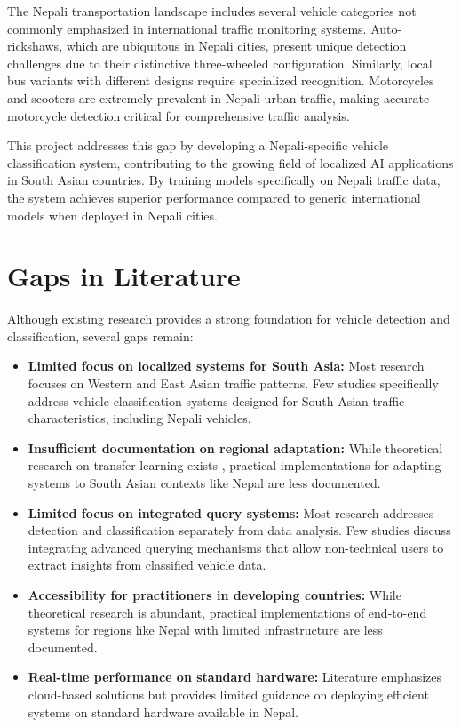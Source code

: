\documentclass[12pt,a4paper]{report}
\begin{document}
The Nepali transportation landscape includes several vehicle categories not commonly emphasized in international traffic monitoring systems. Auto-rickshaws, which are ubiquitous in Nepali cities, present unique detection challenges due to their distinctive three-wheeled configuration. Similarly, local bus variants with different designs require specialized recognition. Motorcycles and scooters are extremely prevalent in Nepali urban traffic, making accurate motorcycle detection critical for comprehensive traffic analysis.

This project addresses this gap by developing a Nepali-specific vehicle classification system, contributing to the growing field of localized AI applications in South Asian countries. By training models specifically on Nepali traffic data, the system achieves superior performance compared to generic international models when deployed in Nepali cities.


\section{Gaps in Literature}

Although existing research provides a strong foundation for vehicle detection and classification, several gaps remain:

\begin{itemize}
    \item \textbf{Limited focus on localized systems for South Asia:} Most research focuses on Western and East Asian traffic patterns. Few studies specifically address vehicle classification systems designed for South Asian traffic characteristics, including Nepali vehicles.
    
    \item \textbf{Insufficient documentation on regional adaptation:} While theoretical research on transfer learning exists \cite{krizhevsky2012imagenet}, practical implementations for adapting systems to South Asian contexts like Nepal are less documented.
    
    \item \textbf{Limited focus on integrated query systems:} Most research addresses detection and classification separately from data analysis. Few studies discuss integrating advanced querying mechanisms that allow non-technical users to extract insights from classified vehicle data.
    
    \item \textbf{Accessibility for practitioners in developing countries:} While theoretical research is abundant, practical implementations of end-to-end systems for regions like Nepal with limited infrastructure are less documented.
    
    \item \textbf{Real-time performance on standard hardware:} Literature emphasizes cloud-based solutions but provides limited guidance on deploying efficient systems on standard hardware available in Nepal.
\end{itemize}
\end{document}
